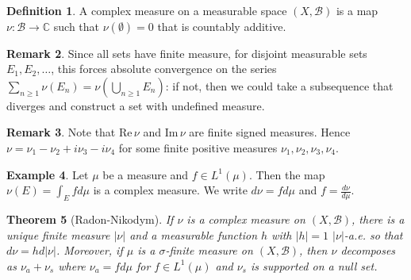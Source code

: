 \documentclass[11pt]{amsart}
\newtheorem{theorem}{Theorem}[section]
\theoremstyle{definition}
\newtheorem{definition}[theorem]{Definition}
\newtheorem{remark}[theorem]{Remark}
\newtheorem{example}[theorem]{Example}
\numberwithin{equation}{section}
\begin{document}
\begin{definition}
    A complex measure on a measurable space $(X,\mathcal B)$ is a map $\nu:\mathcal B\to\mathbb C$ such that $\nu(\emptyset)=0$ that is countably additive.
\end{definition}
\begin{remark}
    Since all sets have finite measure, for disjoint measurable sets $E_1,E_2,\ldots$, this forces absolute convergence on the series $\sum_{n\ge 1}\nu(E_n)=\nu(\bigcup_{n\ge 1}E_n)$: if not, then we could take a subsequence that diverges and construct a set with undefined measure.
\end{remark}
\begin{remark}
    Note that $\mathrm{Re}\,\nu$ and $\mathrm{Im}\,\nu$ are finite signed measures. Hence $\nu=\nu_1-\nu_2+i\nu_3-i\nu_4$ for some finite positive measures $\nu_1,\nu_2,\nu_3,\nu_4$.
\end{remark}
\begin{example}
    Let $\mu$ be a measure and $f\in L^1(\mu)$. Then the map $\nu(E)=\int_Efd\mu$ is a complex measure. We write $d\nu=fd\mu$ and $f=\frac{d\nu}{d\mu}$. 
\end{example}
\begin{theorem}[Radon-Nikodym]\label{radon-nikodym-2}
    If $\nu$ is a complex measure on $(X,\mathcal B)$, there is a unique finite measure $|\nu|$ and a measurable function $h$ with $|h|=1$ $|\nu|$-a.e. so that $d\nu=hd|\nu|$. Moreover, if $\mu$ is a $\sigma$-finite measure on $(X,\mathcal B)$, then $\nu$ decomposes as $\nu_a+\nu_s$ where $\nu_a=fd\mu$ for $f\in L^1(\mu)$ and $\nu_s$ is supported on a null set. 
\end{theorem}
\end{document}
